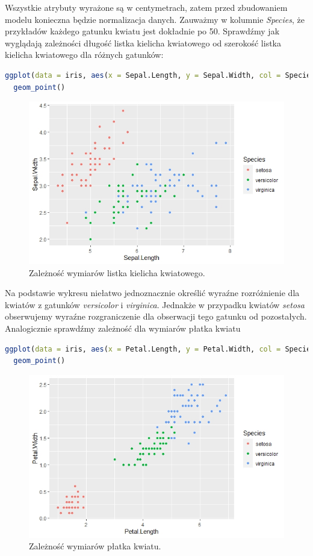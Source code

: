 \documentclass[a4paper]{article}
\begin{document}
Wszystkie atrybuty wyrażone są w centymetrach, zatem przed zbudowaniem modelu konieczna  będzie normalizacja danych. Zauważmy w kolumnie \textit{Species}, że przykładów każdego gatunku kwiatu jest dokładnie po 50. Sprawdźmy jak wyglądają zależności długość listka kielicha kwiatowego od szerokość listka kielicha kwiatowego dla różnych gatunków:
\begin{lstlisting}[language=R,frame=single]
ggplot(data = iris, aes(x = Sepal.Length, y = Sepal.Width, col = Species)) +
  geom_point()
\end{lstlisting}
\begin{figure}[ht]
    \centering
    \includegraphics[width = 300 pt]{Sepal_zaleznosc.jpeg}
    \caption{Zależność wymiarów listka kielicha kwiatowego.}
\end{figure}
Na podstawie wykresu niełatwo jednoznacznie określić wyraźne rozróżnienie dla kwiatów z gatunków \textit{versicolor} i \textit{virginica}. Jednakże w przypadku kwiatów \textit{setosa} obserwujemy wyraźne rozgraniczenie dla obserwacji tego gatunku od pozostałych. \newpage
Analogicznie sprawdźmy zależność dla wymiarów płatka kwiatu
\begin{lstlisting}[language=R,frame=single]
ggplot(data = iris, aes(x = Petal.Length, y = Petal.Width, col = Species)) +
  geom_point()
\end{lstlisting}
\begin{figure}[ht]
    \centering
   \includegraphics[width = 300 pt]{Petal_zaleznosc.jpeg}
    \caption{Zależność wymiarów płatka kwiatu.}
\end{figure}
\end{document}
